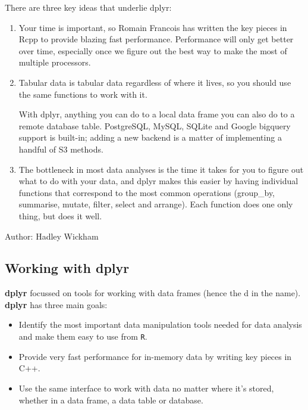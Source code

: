 \documentclass{article}
\begin{document}
	\begin{framed}
		
		
		\noindent There are three key ideas that underlie dplyr:
		
		\begin{enumerate}
			\item Your time is important, so Romain Francois has written the key pieces in Rcpp to provide blazing fast performance. Performance will only get better over time, especially once we figure out the best way to make the most of multiple processors. 
			
			\item Tabular data is tabular data regardless of where it lives, so you should use the same functions to work with it. 
			
			With dplyr, anything you can do to a local data frame you can also do to a remote database table. PostgreSQL, MySQL, SQLite and Google bigquery support is built-in; adding a new backend is a matter of implementing a handful of S3 methods. 
			
			\item The bottleneck in most data analyses is the time it takes for you to figure out what to do with your data, and dplyr makes this easier by having individual functions that correspond to the most common operations  (group\_by, summarise, mutate, filter, select and arrange). Each function does one only thing, but does it well.
		\end{enumerate}
		Author: Hadley Wickham
	\end{framed}
	
	
	\subsection{Working with dplyr} \textbf{dplyr} focussed on tools for working with data frames (hence the d in the name). \textbf{dplyr} has three main goals:
	
	
	\begin{itemize}
		\item Identify the most important data manipulation tools needed for data analysis and make them easy to use from \texttt{R}.
		
		\item Provide very fast performance for in-memory data by writing key pieces in C++.
		
		\item Use the same interface to work with data no matter where it's stored, whether in a data frame, a data table or database.
	\end{itemize}
\end{document}
